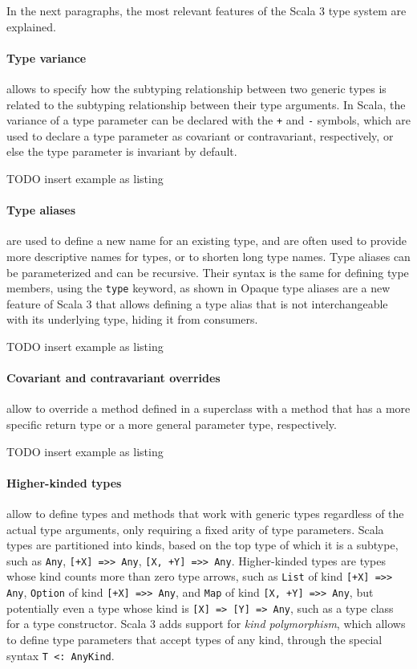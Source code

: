 In the next paragraphs, the most relevant features of the Scala 3 type system are explained.

\paragraph{Type variance} allows to specify how the subtyping relationship between two generic types is related to the subtyping relationship between their type arguments.
%
In Scala, the variance of a type parameter can be declared with the \texttt{+} and \texttt{-} symbols, which are used to declare a type parameter as covariant or contravariant, respectively, or else the type parameter is invariant by default.

TODO insert example as listing

\paragraph{Type aliases} are used to define a new name for an existing type, and are often used to provide more descriptive names for types, or to shorten long type names.
%
Type aliases can be parameterized and can be recursive.
%
Their syntax is the same for defining type members, using the \texttt{type} keyword, as shown in
%
Opaque type aliases are a new feature of Scala 3 that allows defining a type alias that is not interchangeable with its underlying type, hiding it from consumers.

TODO insert example as listing

\paragraph{Covariant and contravariant overrides} allow to override a method defined in a superclass with a method that has a more specific return type or a more general parameter type, respectively.

TODO insert example as listing

\paragraph{Higher-kinded types} allow to define types and methods that work with generic types regardless of the actual type arguments, only requiring a fixed arity of type parameters.
%
Scala types are partitioned into kinds, based on the top type of which it is a subtype, such as \texttt{Any}, \texttt{[+X] =>> Any}, \texttt{[X, +Y] =>> Any}.
%
Higher-kinded types are types whose kind counts more than zero type arrows, such as \texttt{List} of kind \texttt{[+X] =>> Any}, \texttt{Option} of kind \texttt{[+X] =>> Any}, and \texttt{Map} of kind \texttt{[X, +Y] =>> Any}, but potentially even a type whose kind is \texttt{[X] => [Y] => Any}, such as a type class for a type constructor.
%
Scala 3 adds support for \textit{kind polymorphism}, which allows to define type parameters that accept types of any kind, through the special syntax \texttt{T <: AnyKind}.

